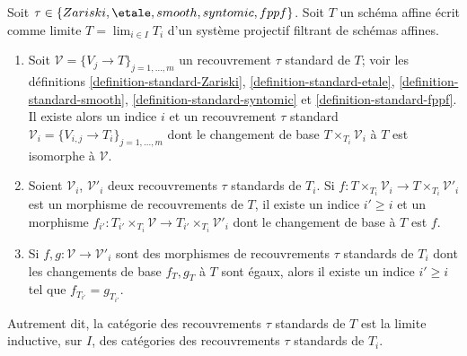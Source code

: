 \begin{lemma}
\label{lemma-limit-fppf-topology}
Soit $\tau \in \{Zariski, \etale, smooth, syntomic, fppf\}$.
Soit $T$ un schéma affine écrit comme limite
$T = \lim_{i \in I} T_i$ d'un système projectif filtrant de schémas affines.
\begin{enumerate}
\item Soit $\mathcal{V} = \{V_j \to T\}_{j = 1, \ldots, m}$ un
recouvrement $\tau$ standard de $T$; voir les définitions
\ref{definition-standard-Zariski},
\ref{definition-standard-etale},
\ref{definition-standard-smooth},
\ref{definition-standard-syntomic} et
\ref{definition-standard-fppf}.
Il existe alors un indice $i$ et un recouvrement $\tau$ standard
$\mathcal{V}_i = \{V_{i, j} \to T_i\}_{j = 1, \ldots, m}$
dont le changement de base $T \times_{T_i} \mathcal{V}_i$ à $T$
est isomorphe à $\mathcal{V}$.
\item Soient $\mathcal{V}_i$, $\mathcal{V}'_i$ deux recouvrements
$\tau$ standards de $T_i$. Si
$f : T \times_{T_i} \mathcal{V}_i \to T \times_{T_i} \mathcal{V}'_i$ est
un morphisme de recouvrements de $T$, il existe un indice
$i' \geq i$ et un morphisme
$f_{i'} : T_{i'} \times_{T_i} \mathcal{V} \to
T_{i'} \times_{T_i} \mathcal{V}'_i$
dont le changement de base à $T$ est $f$.
\item Si
$f, g : \mathcal{V} \to \mathcal{V}'_i$
sont des morphismes de recouvrements $\tau$ standards de $T_i$ dont
les changements de base $f_T, g_T$ à $T$ sont égaux, alors il existe un
indice $i' \geq i$ tel que $f_{T_{i'}} = g_{T_{i'}}$.
\end{enumerate}
Autrement dit, la catégorie des recouvrements $\tau$ standards de $T$ est
la limite inductive, sur $I$, des catégories des recouvrements $\tau$ standards de $T_i$.
\end{lemma}

